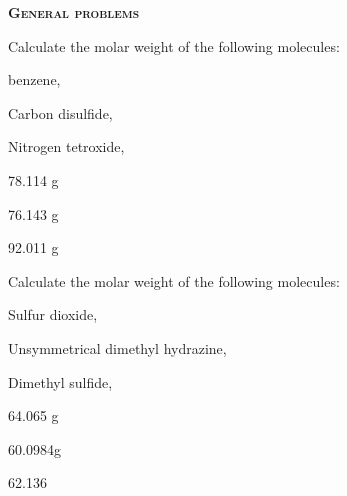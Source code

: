 \documentclass[main.tex]{subfiles}
\begin{document}
\begin{multicols*}{2}
{\raggedright\textsc{\textbf{General problems }}\par}
\begin{question}[ID=\the\value{numA}]
Calculate the molar weight of the following molecules:
\begin{inparaenum}[(a)]	
\item  benzene, 				%
\item  Carbon disulfide, 		%
\item  Nitrogen tetroxide, 		%
\end{inparaenum} 
\end{question}
\begin{solution}
\begin{inparaenum}[(a)]	
\item   78.114 g\mol
\item   76.143 g\mol
\item   92.011 g\mol
\end{inparaenum} 
\hspace{0.1cm}\end{solution}%
\begin{question}[ID=\the\value{numA}]
Calculate the molar weight of the following molecules:
\begin{inparaenum}[(a)]	
\item  Sulfur dioxide, 		%
\item Unsymmetrical dimethyl hydrazine,    %
\item Dimethyl sulfide, 		%
\end{inparaenum} 
\end{question}
\begin{solution}
\begin{inparaenum}[(a)]	
\item   64.065 g\mol
\item  60.0984g\mol
\item  62.136
\end{inparaenum} 
\hspace{0.1cm}\end{solution}%


\end{multicols*}
\end{document}
